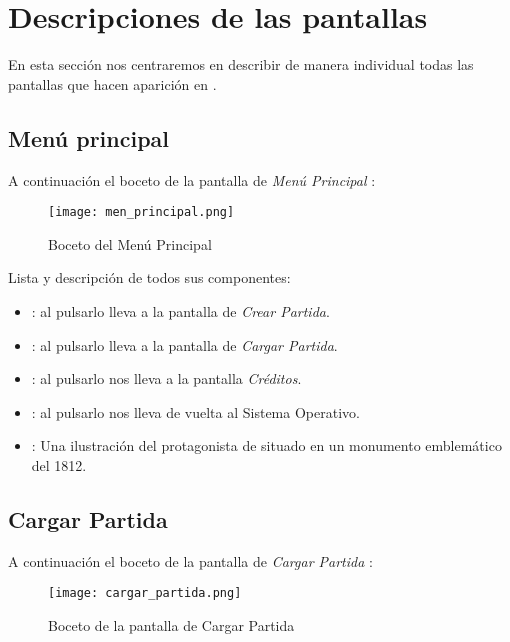         \section{Descripciones de las pantallas}
        En esta sección nos centraremos en describir de manera individual todas las pantallas que hacen aparición en \nombrejuego.
        
        \newpage
            \subsection{Menú principal}
            A continuación el boceto de la pantalla de \emph{Menú Principal} :
            
            \begin{figure}[H] 
                \begin{center}
                    \texttt{[image: men\_principal.png]}
                \end{center}
                \caption{Boceto del Menú Principal}
                \label{fig:menu-principal}
            \end{figure}
            
            Lista y descripción de todos sus componentes:
            \begin{itemize}
            \item {}: al pulsarlo lleva a la pantalla de \emph{Crear Partida}.
            \item {}: al pulsarlo lleva a la pantalla de \emph{Cargar Partida}.
            \item {}: al pulsarlo nos lleva a la pantalla \emph{Créditos}.
            \item {}: al pulsarlo nos lleva de vuelta al Sistema Operativo.
            \item {}: Una ilustración del protagonista de \nombrejuego situado en un monumento emblemático del 1812.
            \end{itemize}
            
            \newpage
            \subsection{Cargar Partida}
            A continuación el boceto de la pantalla de \emph{Cargar Partida} :
            
            \begin{figure}[H] 
                \begin{center}
                    \texttt{[image: cargar\_partida.png]}
                \end{center}
                \caption{Boceto de la pantalla de Cargar Partida}
                \label{fig:cargar-partida}
            \end{figure}
            
